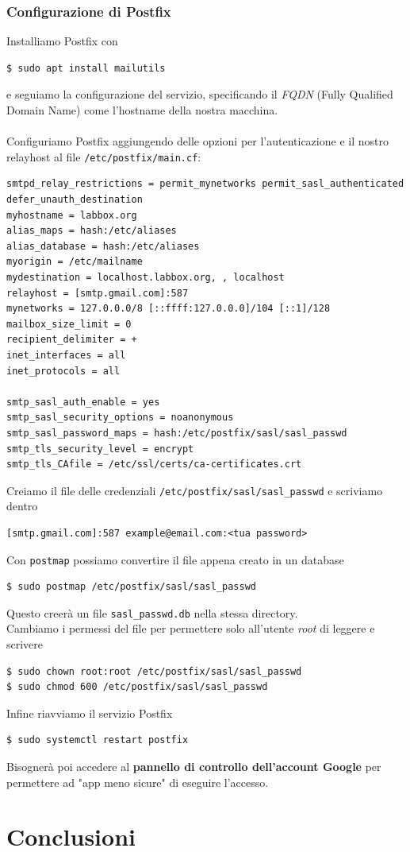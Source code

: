 \documentclass[11pt]{article}
\begin{document}
\subsubsection{Configurazione di Postfix}
Installiamo Postfix con
\begin{verbatim}
$ sudo apt install mailutils
\end{verbatim}
e seguiamo la configurazione del servizio, specificando il \textit{FQDN} (Fully Qualified Domain Name) come l'hostname della nostra macchina.
\\
\\
Configuriamo Postfix aggiungendo delle opzioni per l'autenticazione e il nostro relayhost al file \texttt{/etc/postfix/main.cf}:
\begin{lstlisting}[caption={main.cf}]
smtpd_relay_restrictions = permit_mynetworks permit_sasl_authenticated defer_unauth_destination
myhostname = labbox.org
alias_maps = hash:/etc/aliases
alias_database = hash:/etc/aliases
myorigin = /etc/mailname
mydestination = localhost.labbox.org, , localhost
relayhost = [smtp.gmail.com]:587
mynetworks = 127.0.0.0/8 [::ffff:127.0.0.0]/104 [::1]/128
mailbox_size_limit = 0
recipient_delimiter = +
inet_interfaces = all
inet_protocols = all
    
smtp_sasl_auth_enable = yes
smtp_sasl_security_options = noanonymous
smtp_sasl_password_maps = hash:/etc/postfix/sasl/sasl_passwd
smtp_tls_security_level = encrypt
smtp_tls_CAfile = /etc/ssl/certs/ca-certificates.crt
\end{lstlisting}
Creiamo il file delle credenziali \texttt{/etc/postfix/sasl/sasl\_passwd} e scriviamo dentro
\begin{verbatim}
[smtp.gmail.com]:587 example@email.com:<tua password>
\end{verbatim}
Con \texttt{postmap} possiamo convertire il file appena creato in un database
\begin{verbatim}
$ sudo postmap /etc/postfix/sasl/sasl_passwd
\end{verbatim}
Questo creerà un file \texttt{sasl\_passwd.db} nella stessa directory.
\\
Cambiamo i permessi del file per permettere solo all'utente \textit{root} di leggere e scrivere
\begin{verbatim}
$ sudo chown root:root /etc/postfix/sasl/sasl_passwd
$ sudo chmod 600 /etc/postfix/sasl/sasl_passwd
\end{verbatim}
Infine riavviamo il servizio Postfix
\begin{verbatim}
$ sudo systemctl restart postfix
\end{verbatim}

Bisognerà poi accedere al \textbf{pannello di controllo dell'account Google} per permettere ad "app meno sicure" di eseguire l'accesso.

\section{Conclusioni}
\end{document}
